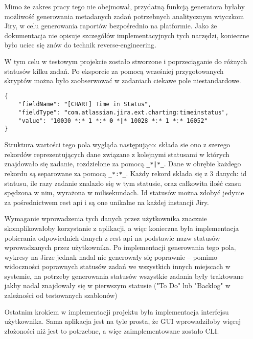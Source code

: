 Mimo że zakres pracy tego nie obejmował, przydatną funkcją generatora byłaby możliwość generowania metadanych zadań potrzebnych analitycznym wtyczkom Jiry, w celu generowania raportów bezpośrednio na platformie.
Jako że dokumentacja nie opisuje szczegółów implementacyjnych tych narzędzi, konieczne było uciec się znów do technik reverse-engineering.

W tym celu w testowym projekcie zostało stworzone i poprzeciąganie do różnych statusów kilku zadań. Po eksporcie za pomocą wcześniej przygotowanych skryptów można było zaobserwować w zadaniach ciekawe pole niestandardowe.
\newpage
\begin{lstlisting}[caption=Pole niestandardowe "time in status"]
{
    "fieldName": "[CHART] Time in Status",
    "fieldType": "com.atlassian.jira.ext.charting:timeinstatus",
    "value": "10030_*:*_1_*:*_0_*|*_10028_*:*_1_*:*_16052"
}
\end{lstlisting}
Struktura wartości tego pola wygląda następująco: składa sie ono z szerego rekordów reprezentujących dane związane z kolejnymi statusami w których znajdowało się zadanie, rozdzielone za pomocą \lstinline!_*|*_!.
Dane w obrębie każdego rekordu są separowane za pomocą \lstinline!_*:*_!. Każdy rekord składa się z 3 danych: id statusu, ile razy zadanie znalazło się w tym statusie, oraz całkowita ilość czasu spędzona w nim, wyrażona w milisekundach.
Id statusów można zdobyć jedynie za pośrednictwem rest api i są one unikalne na każdej instancji Jiry.

Wymaganie wprowadzenia tych danych przez użytkownika znacznie skomplikowałoby korzystanie z aplikacji, a więc konieczna była implementacja
pobierania odpowiednich danych z rest api na podstawie nazw statusów wprowadzanych przez użytkownika. Po implementacji generowania tego pola, wykresy na Jirze jednak nadal nie generowały się poprawnie -- pomimo widoczności poprawnych statusów
zadań we wszystkich innych miejscach w systemie, na potrzeby generowania statusów wszystkie zadania były traktowane jakby nadal znajdowały się w pierwszym statusie ("To Do" lub "Backlog" w zależności od testowanych szablonów)

Ostatnim krokiem w implementacji projektu była implementacja interfejsu użytkownika. Sama aplikacja jest na tyle prosta, że GUI wprowadziłoby więcej
złożoności niż jest to potrzebne, a więc zaimplementowane zostało CLI.

